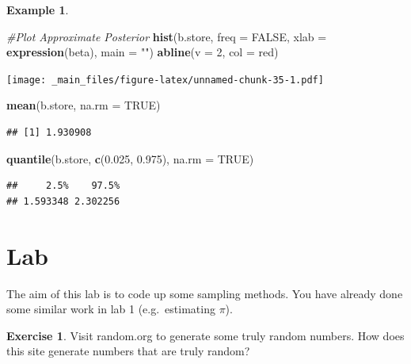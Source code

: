 \documentclass[
]{book}
\newenvironment{Shaded}{\begin{snugshade}}{\end{snugshade}}
\newcommand{\AttributeTok}[1]{\textcolor[rgb]{0.13,0.29,0.53}{#1}}
\newcommand{\CommentTok}[1]{\textcolor[rgb]{0.56,0.35,0.01}{\textit{#1}}}
\newcommand{\ConstantTok}[1]{\textcolor[rgb]{0.56,0.35,0.01}{#1}}
\newcommand{\DecValTok}[1]{\textcolor[rgb]{0.00,0.00,0.81}{#1}}
\newcommand{\FloatTok}[1]{\textcolor[rgb]{0.00,0.00,0.81}{#1}}
\newcommand{\FunctionTok}[1]{\textcolor[rgb]{0.13,0.29,0.53}{\textbf{#1}}}
\newcommand{\NormalTok}[1]{#1}
\newcommand{\StringTok}[1]{\textcolor[rgb]{0.31,0.60,0.02}{#1}}
\theoremstyle{definition}
\theoremstyle{definition}
\newtheorem{example}{Example}[chapter]
\theoremstyle{definition}
\newtheorem{exercise}{Exercise}[chapter]
\theoremstyle{definition}
\theoremstyle{remark}
\begin{document}
\begin{example}
\begin{Shaded}
\begin{Highlighting}[]
\CommentTok{\#Plot Approximate Posterior}
\FunctionTok{hist}\NormalTok{(b.store, }\AttributeTok{freq =} \ConstantTok{FALSE}\NormalTok{, }\AttributeTok{xlab =} \FunctionTok{expression}\NormalTok{(beta), }\AttributeTok{main =} \StringTok{""}\NormalTok{)}
\FunctionTok{abline}\NormalTok{(}\AttributeTok{v =} \DecValTok{2}\NormalTok{, }\AttributeTok{col =} \StringTok{\textquotesingle{}red\textquotesingle{}}\NormalTok{)}
\end{Highlighting}
\end{Shaded}

\texttt{[image: \_main\_files/figure-latex/unnamed-chunk-35-1.pdf]}

\begin{Shaded}
\begin{Highlighting}[]
\FunctionTok{mean}\NormalTok{(b.store, }\AttributeTok{na.rm =} \ConstantTok{TRUE}\NormalTok{)}
\end{Highlighting}
\end{Shaded}

\begin{verbatim}
## [1] 1.930908
\end{verbatim}

\begin{Shaded}
\begin{Highlighting}[]
\FunctionTok{quantile}\NormalTok{(b.store, }\FunctionTok{c}\NormalTok{(}\FloatTok{0.025}\NormalTok{, }\FloatTok{0.975}\NormalTok{), }\AttributeTok{na.rm =} \ConstantTok{TRUE}\NormalTok{)}
\end{Highlighting}
\end{Shaded}

\begin{verbatim}
##     2.5%    97.5% 
## 1.593348 2.302256
\end{verbatim}

\end{example}

\hypertarget{lab-1}{%
\section{Lab}\label{lab-1}}

The aim of this lab is to code up some sampling methods. You have already done some similar work in lab 1 (e.g.~estimating \(\pi\)).

\begin{exercise}
Visit random.org to generate some truly random numbers. How does this site generate numbers that are truly random?
\end{exercise}
\end{document}

